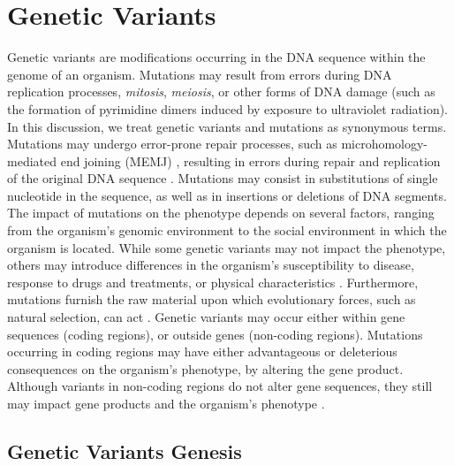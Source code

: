 \documentclass[a4paper, titlepage, openright]{book}
\newcommand{\mychapter}[2]{
    \setcounter{chapter}{#1}
    \setcounter{section}{0}
    \chapter*{#2}
    \addcontentsline{toc}{chapter}{#2}
}
\begin{document}
\mychapter{2}{Genetic Variants}
Genetic variants are modifications occurring in the DNA sequence within the genome of an organism. Mutations may result from errors during DNA replication processes, \emph{mitosis}, \emph{meiosis}, or other forms of DNA damage (such as the formation of pyrimidine dimers induced by exposure to ultraviolet radiation). In this discussion, we treat genetic variants and mutations as synonymous terms. Mutations may undergo error-prone repair processes, such as microhomology-mediated end joining (MEMJ) \citep{sinha2017microhomology, seol2018microhomology}, resulting in errors during repair and replication of the original DNA sequence \citep{rodgers2016error}. Mutations may consist in substitutions of single nucleotide in the sequence, as well as in insertions or deletions of DNA segments. The impact of mutations on the phenotype depends on several factors, ranging from the organism's genomic environment to the social environment in which the organism is located. While some genetic variants may not impact the phenotype, others may introduce differences in the organism's susceptibility to disease, response to drugs and treatments, or physical characteristics \citep{bodmer2008common, ingelman2018integrating, mitchell2007evolutionary}. Furthermore, mutations furnish the raw material upon which evolutionary forces, such as natural selection, can act \citep{akey2004population, teotonio2009experimental}. Genetic variants may occur either within gene sequences (coding regions), or outside genes (non-coding regions).  Mutations occurring in coding regions may have either advantageous or deleterious consequences on the organism's phenotype, by altering the gene product. Although variants in non-coding regions do not alter gene sequences, they still may impact gene products and the organism's phenotype \citep{zhang2015non}. 

\section{Genetic Variants Genesis}
\end{document}
